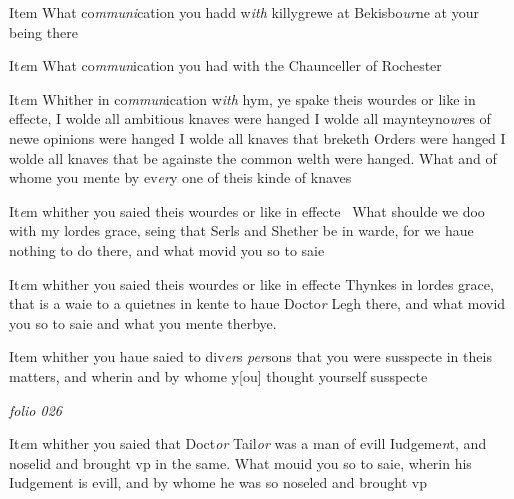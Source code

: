 \documentclass[12pt, a4paper]{book}
\begin{document}
		\ifthenelse{\isodd{\thepage}}
		{\reversemarginpar}
		{\normalmarginpar}
		Item What co\textit{mmuni}cation you hadd w\textit{ith} killygrewe at Bekisbo\textit{ur}ne
 at your being there
            		
		\ifthenelse{\isodd{\thepage}}
		{\reversemarginpar}
		{\normalmarginpar}
		It\textit{e}m What co\textit{mmun}ication you had with the Chaunceller of Rochester
            			
		\ifthenelse{\isodd{\thepage}}
		{\reversemarginpar}
		{\normalmarginpar}
		It\textit{e}m Whither in co\textit{mmun}ication w\textit{ith} hym, ye spake theis wourdes
 or like in effecte, I wolde all ambitious knaves were hanged
 I wolde all maynteyno\textit{ur}es of newe opinions were hanged
 I wolde all knaves that breketh Orders were hanged
 I wolde all knaves that be againste the common welth were
 hanged. What and of whome you mente by ev\textit{er}y one
            			of theis kinde of knaves
            		
		\ifthenelse{\isodd{\thepage}}
		{\reversemarginpar}
		{\normalmarginpar}
		It\textit{e}m whither you saied theis wourdes or like in effecte 
            			What shoulde we doo with my lordes grace, seing that
 Serls and Shether be in warde, for we haue nothing
 to do there, and what movid you so to saie
            		
		\ifthenelse{\isodd{\thepage}}
		{\reversemarginpar}
		{\normalmarginpar}
		It\textit{e}m whither you saied theis wourdes or like in effecte
            			Thynkes in lordes grace, that is a waie to a quietnes
            			in kente to haue Docto\textit{r} Legh there, and what movid
            			you so to saie and what you mente therbye.
            		
		\ifthenelse{\isodd{\thepage}}
		{\reversemarginpar}
		{\normalmarginpar}
		Item whither you haue saied to div\textit{er}s \textit{per}sons that you were
 susspecte in theis matters, and wherin and by whome y[ou]
 thought yourself susspecte
 

\dotfill
						\newpage
{}

\textit{folio 026}


 	
				\marginpar[\vspace{0.5cm}{\textcolor{Gray}{n}}]{}
			
		\ifthenelse{\isodd{\thepage}}
		{\reversemarginpar}
		{\normalmarginpar}
		It\textit{e}m whither you saied that Doct\textit{or} Tail\textit{or} was a man of evill Iudgeme\textit{n}t, and noselid and brought vp in the same. What mouid you so to saie, wherin his Iudgement is evill, and by whome he was so noseled and brought vp 
 	
\end{document}
